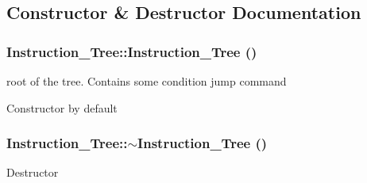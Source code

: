 \subsection{Constructor \& Destructor Documentation}
\hypertarget{classInstruction__Tree_a5d61b36f6c10b48c4ec6d844226a81eb}{
\subsubsection[{Instruction\_\-Tree}]{\setlength{\rightskip}{0pt plus 5cm}Instruction\_\-Tree::Instruction\_\-Tree ()}}
\label{classInstruction__Tree_a5d61b36f6c10b48c4ec6d844226a81eb}


root of the tree. Contains some condition jump command 

Constructor by default \hypertarget{classInstruction__Tree_abbd3825561af346def028707498fbd9b}{
\subsubsection[{$\sim$Instruction\_\-Tree}]{\setlength{\rightskip}{0pt plus 5cm}Instruction\_\-Tree::$\sim$Instruction\_\-Tree ()}}
\label{classInstruction__Tree_abbd3825561af346def028707498fbd9b}
Destructor 

